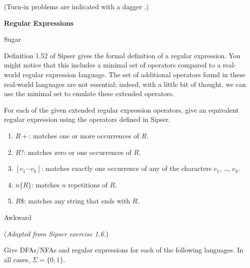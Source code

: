 \documentclass[11pt]{book}
\newcommand{\doctitle}{Regular Expressions}
\begin{document}
\begin{center}
  (Turn-in problems are indicated with a dagger \turninproblem{}.)
\end{center}

\begin{center}
  \large\textbf{{\doctitle}}
\end{center}

\vspace{2em}


\begin{problem}{Sugar}

Definition 1.52 of Sipser gives the formal definition of a regular expression.
You might notice that this includes a minimal set of operators compared to a
real-world regular expression language.  The set of additional operators found
in these real-world languages are not essential; indeed, with a little bit of
thought, we can use the minimal set to emulate these extended operators.

For each of the given extended regular expression operators, give an equivalent
regular expression using the operators defined in Sipser.

\begin{enumerate}[label=(\alph*)]
  \item \( R+ \): matches one or more occurrences of \( R \).
  \item \( R? \): matches zero or one occurrences of \( R \).
  \item \( [c_1 \cdots c_k] \): matches exactly one occurrence of any of the
    characters \( c_1 \), \ldots, \( c_k \).
  \item \( n\{R\} \): matches \( n \) repetitions of \( R \).
  \item \( R\$ \): matches any string that ends with \( R \).
\end{enumerate}

\end{problem}


\vspace{1in}

\begin{problem}{Awkward}

(\emph{Adapted from Sipser exercise 1.6.})

Give DFAs/NFAs and regular expressions for each of the following languages.  In
all cases, \( \Sigma = \{ 0, 1 \} \).


\end{problem}
\end{document}
